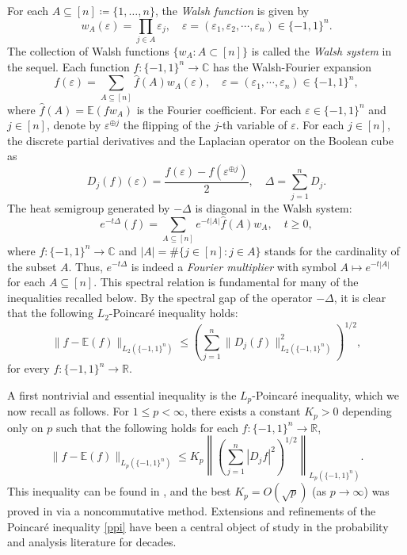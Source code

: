 \documentclass{amsbook}
\theoremstyle{definition}
\theoremstyle{remark}
\numberwithin{section}{chapter}
\numberwithin{equation}{chapter}
\newcommand{\1}{\mathbf{1}}
\begin{document}
For each $A\subseteq [n]\coloneqq \{1,\dots, n\}$, the \emph{Walsh function} is given by
\[
w_A(\varepsilon)=\prod_{j\in A}\varepsilon_j,\quad \varepsilon=(\varepsilon_1,\varepsilon_2,\cdots,\varepsilon_n)\in \{-1,1\}^n.
\]
The collection of Walsh functions $\{w_A : A \subset [n]\}$ is called the \emph{Walsh system} in the sequel. Each function $f:\{-1,1\}^n\to \mathbb{C}$ has the Walsh-Fourier expansion
\begin{equation}
f(\varepsilon)=\sum_{A\subseteq [n]}\widehat{f}(A)w_A(\varepsilon), \quad \varepsilon=(\varepsilon_1,\cdots,\varepsilon_n)\in \{-1,1\}^{n},
\end{equation}
where $\widehat{f}(A)=\mathbb{E}(fw_A)$ is the Fourier coefficient. For each $\varepsilon\in \{-1,1\}^n$ and $j\in [n]$, denote by $\varepsilon^{\oplus j}$ the flipping of the $j$-th variable of $\varepsilon$. For each $j\in [n]$, the discrete partial derivatives  and the Laplacian operator on the Boolean cube as 
 \begin{equation}\label{lap-1}
 D_j(f)(\varepsilon)=\frac{f(\varepsilon)-f(\varepsilon^{\oplus j})}{2}, \quad \Delta =\sum_{j=1}^n D_j.
 \end{equation}
The heat semigroup generated by $-\Delta$ is diagonal in the Walsh system:
\begin{equation}\label{heat-semigroup}
e^{-t\Delta}(f)=\sum_{A\subseteq [n]}e^{-t|A|}\widehat{f}(A)w_{A},\quad t\geq 0,
\end{equation}
where $f:\{-1,1\}^{n}\to \mathbb{C}$ and $|A|=\#\{j\in [n]:j\in A\}$ stands for the cardinality of the subset $A$. Thus, $e^{-t\Delta}$ is indeed a \emph{Fourier multiplier} with symbol $A\mapsto e^{-t|A|}$ for each $A\subseteq [n]$. This spectral relation is fundamental for many of the inequalities recalled below. By the spectral gap of the operator $-\Delta$, it is clear that the following $L_{2}$-Poincar\'e inequality holds:
\[
\|f-\mathbb{E}(f)\|_{L_{2}(\{-1,1\}^{n})}\leq \left(\sum_{j=1}^{n}\|D_{j}(f)\|^{2}_{L_{2}(\{-1,1\}^{n})}\right)^{1/2},
\]
for every $f:\{-1,1\}^{n}\to \mathbb{R}$.

A first nontrivial and essential inequality is the $L_{p}$-Poincar\'e inequality, which we now recall as follows. For $1\leq p<\infty$, there exists a constant $K_{p}>0$ depending only on $p$ such that the following holds for each $f:\{-1,1\}^n\to\mathbb{R}$,
 \begin{equation}\label{ppi}
\|f-\mathbb{E}(f)\|_{L_{p}(\{-1,1\}^{n})}\leq K_{p}\left\|\left(\sum_{j=1}^{n}|D_jf|^{2}\right)^{1/2}\right\|_{L_{p}(\{-1,1\}^{n})}.
\end{equation}
This inequality can be found in \cite{Pi1986,Ta1993}, and the best $K_p=O(\sqrt{p})$ (as $p\to \infty$) was proved in \cite{EL2008} via a noncommutative method. Extensions and refinements of the Poincar\'e inequality \eqref{ppi} have been a central object of study in the probability and analysis
literature for decades.
\end{document}
